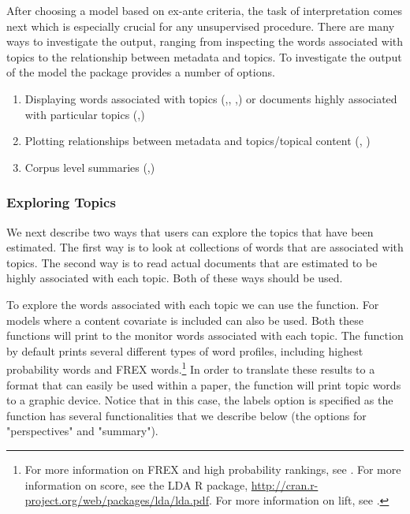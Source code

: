\documentclass[nojss]{jss}
\begin{document}
After choosing a model based on ex-ante criteria, the task of interpretation comes next which is especially crucial for any unsupervised procedure. There are many ways to investigate the output, ranging from inspecting the words associated with topics to the relationship between metadata and topics. To investigate the output of the model the  package provides a number of options.

\begin{enumerate}
\item Displaying words associated with topics (,, ,) or documents highly associated with particular topics (,)
\item Plotting relationships between metadata and topics/topical content (, )
\item Corpus level summaries (,)
\end{enumerate}

\subsubsection{Exploring Topics}

We next describe two ways that users can explore the topics that have been estimated. The first way is to look at collections of words that are associated with topics. The second way is to read actual documents that are estimated to be highly associated with each topic. Both of these ways should be used.

To explore the words associated with each topic we can use the  function.  For models where a content covariate is included  can also be used. Both these functions will print to the monitor words associated with each topic. The function by default prints several different types of word profiles, including highest probability words and FREX words.\footnote{For more information on FREX and high probability rankings, see \citet{nips2013,STMEdo,ajps,TextComparative}. For more information on score, see the LDA R package, \url{http://cran.r-project.org/web/packages/lda/lda.pdf}. For more information on lift, see \citet{taddy2012multinomial}.}  In order to translate these results to a format that can easily be used within a paper, the  function will print topic words to a graphic device. Notice that in this case, the labels option is specified as the  function has several functionalities that we describe below (the options for "perspectives" and "summary").
\end{document}

